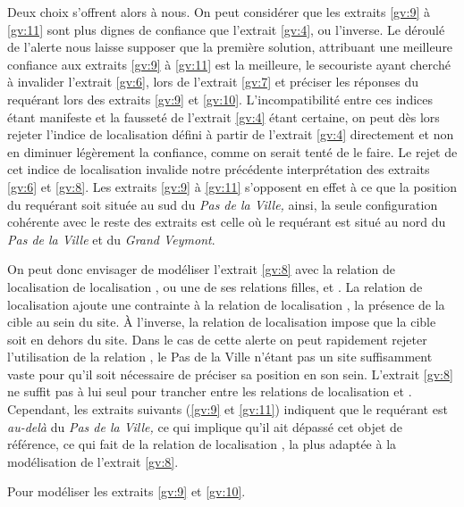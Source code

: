Deux choix s'offrent alors à nous. On peut considérer que les extraits
\ref{gv:9} à \ref{gv:11} sont plus dignes de confiance que l'extrait
\ref{gv:4}, ou l'inverse. Le déroulé de l'alerte nous laisse supposer
que la première solution, attribuant une meilleure confiance aux
extraits \ref{gv:9} à \ref{gv:11} est la meilleure, le secouriste
ayant cherché à invalider l'extrait \ref{gv:6}, lors de l'extrait
\ref{gv:7} et préciser les réponses du requérant lors des extraits
\ref{gv:9} et \ref{gv:10}. L'incompatibilité entre ces indices étant
manifeste et la fausseté de l'extrait \ref{gv:4} étant certaine, on
peut dès lors rejeter l'indice de localisation défini à partir de
l'extrait \ref{gv:4} directement et non en diminuer légèrement la
confiance, comme on serait tenté de le faire. Le rejet de cet indice
de localisation invalide notre précédente interprétation des extraits
\ref{gv:6} et \ref{gv:8}. Les extraits \ref{gv:9} à \ref{gv:11}
s'opposent en effet à ce que la position du requérant soit située au
sud du \emph{Pas de la Ville,} ainsi, la seule configuration cohérente
avec le reste des extraits est celle où le requérant est situé au nord
du \emph{Pas de la Ville} et du \emph{Grand Veymont}.

On peut donc envisager de modéliser l'extrait \ref{gv:8} avec la
relation de localisation de localisation , ou
une de ses relations filles,  et
. La relation de localisation
 ajoute une contrainte à la
relation de localisation , la présence de la
cible au sein du site. À l'inverse, la relation de localisation
 impose que la cible soit en dehors
du site. Dans le cas de cette alerte on peut rapidement rejeter
l'utilisation de la relation ,
le Pas de la Ville n'étant pas un site suffisamment vaste pour qu'il
soit nécessaire de préciser sa position en son sein. L'extrait
\ref{gv:8} ne suffit pas à lui seul pour trancher entre les relations
de localisation  et
. Cependant, les extraits suivants
(\ref{gv:9} et \ref{gv:11}) indiquent que le requérant est
\emph{au-delà} du \emph{Pas de la Ville,} ce qui implique qu'il ait
dépassé cet objet de référence, ce qui fait de la relation de
localisation , la plus adaptée à la
modélisation de l'extrait \ref{gv:8}.

Pour modéliser les extraits \ref{gv:9} et \ref{gv:10}.

